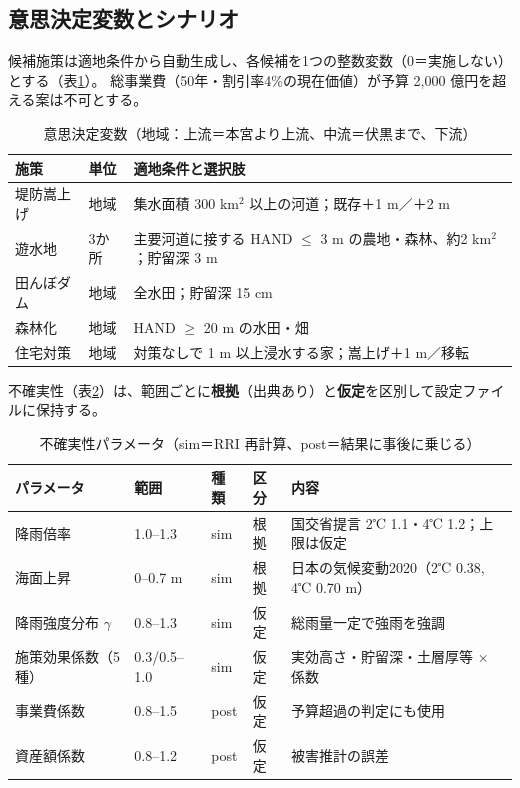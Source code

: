 \documentclass[a4paper,10pt]{ltjsarticle}
\begin{document}
\subsection{意思決定変数とシナリオ}
候補施策は適地条件から自動生成し、各候補を1つの整数変数（0＝実施しない）とする（表\ref{tab:vars}）。
総事業費（50年・割引率4\%の現在価値）が予算 2,000 億円を超える案は不可とする。

\begin{table}[h]
\centering\small
\caption{意思決定変数（地域：上流＝本宮より上流、中流＝伏黒まで、下流）}
\label{tab:vars}
\begin{tabularx}{\linewidth}{@{}llX@{}}
\toprule
施策 & 単位 & 適地条件と選択肢 \\
\midrule
堤防嵩上げ & 地域 & 集水面積 300 km$^2$ 以上の河道；既存＋1 m／＋2 m \\
遊水地 & 3か所 & 主要河道に接する HAND $\le$ 3 m の農地・森林、約2 km$^2$；貯留深 3 m \\
田んぼダム & 地域 & 全水田；貯留深 15 cm \\
森林化 & 地域 & HAND $\ge$ 20 m の水田・畑 \\
住宅対策 & 地域 & 対策なしで 1 m 以上浸水する家；嵩上げ＋1 m／移転 \\
\bottomrule
\end{tabularx}
\end{table}

不確実性（表\ref{tab:unc}）は、範囲ごとに\textbf{根拠}（出典あり）と\textbf{仮定}を区別して設定ファイルに保持する。

\begin{table}[h]
\centering\small
\caption{不確実性パラメータ（sim＝RRI 再計算、post＝結果に事後に乗じる）}
\label{tab:unc}
\begin{tabularx}{\linewidth}{@{}llllX@{}}
\toprule
パラメータ & 範囲 & 種類 & 区分 & 内容 \\
\midrule
降雨倍率 & 1.0–1.3 & sim & 根拠 & 国交省提言 2℃ 1.1・4℃ 1.2；上限は仮定 \\
海面上昇 & 0–0.7 m & sim & 根拠 & 日本の気候変動2020（2℃ 0.38, 4℃ 0.70 m） \\
降雨強度分布 $\gamma$ & 0.8–1.3 & sim & 仮定 & 総雨量一定で強雨を強調 \\
施策効果係数（5種） & 0.3/0.5–1.0 & sim & 仮定 & 実効高さ・貯留深・土層厚等 × 係数 \\
事業費係数 & 0.8–1.5 & post & 仮定 & 予算超過の判定にも使用 \\
資産額係数 & 0.8–1.2 & post & 仮定 & 被害推計の誤差 \\
\bottomrule
\end{tabularx}
\end{table}
\end{document}
